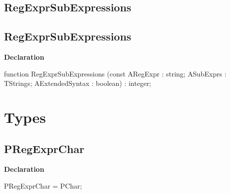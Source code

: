 \documentclass{report}
\newif\ifpdf
\begin{document}
\subsection*{\large{\textbf{RegExprSubExpressions}}\normalsize\hspace{1ex}\hrulefill}
\else
\subsection*{RegExprSubExpressions}
\fi
\label{RegExpr-RegExprSubExpressions}
\begin{list}{}{
\setlength{\itemindent}{0cm}
\setlength{\listparindent}{0cm}
\setlength{\leftmargin}{\evensidemargin}
\addtolength{\leftmargin}{\tmplength}
\settowidth{\labelsep}{X}
\addtolength{\leftmargin}{\labelsep}
\setlength{\labelwidth}{\tmplength}
}
\item[\textbf{Declaration}\hfill]
\ifpdf
\begin{flushleft}
\fi
\begin{ttfamily}
function RegExprSubExpressions (const ARegExpr : string; ASubExprs : TStrings; AExtendedSyntax : boolean) : integer;\end{ttfamily}

\ifpdf
\end{flushleft}
\fi

\end{list}
\section{Types}
\ifpdf
\subsection*{\large{\textbf{PRegExprChar}}\normalsize\hspace{1ex}\hrulefill}
\else
\subsection*{PRegExprChar}
\fi
\label{RegExpr-PRegExprChar}
\begin{list}{}{
\setlength{\itemindent}{0cm}
\setlength{\listparindent}{0cm}
\setlength{\leftmargin}{\evensidemargin}
\addtolength{\leftmargin}{\tmplength}
\settowidth{\labelsep}{X}
\addtolength{\leftmargin}{\labelsep}
\setlength{\labelwidth}{\tmplength}
}
\item[\textbf{Declaration}\hfill]
\ifpdf
\begin{flushleft}
\fi
\begin{ttfamily}
PRegExprChar = PChar;\end{ttfamily}

\ifpdf
\end{flushleft}
\fi

\end{list}
\ifpdf
\end{document}
